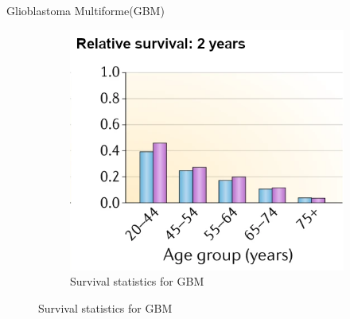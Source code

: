 \documentclass[aspectratio=169,9pt]{beamer}
\begin{document}
\begin{frame}{Glioblastoma Multiforme(GBM)}
\begin{adjustwidth}{-5cm}{-5cm}
\begin{figure}
\begin{subfigure}{0.25\textwidth}
                    \includegraphics[width=\textwidth]{GBMsurv}
                    \caption{Survival statistics for GBM \footnotemark[2]}
                \end{subfigure}
            \end{figure}
        \end{adjustwidth}
    \end{frame}
\end{document}
